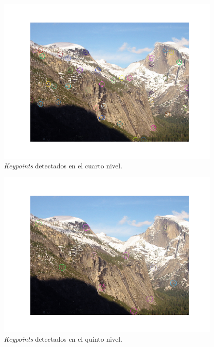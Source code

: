 \documentclass[11pt,a4paper]{article}
\begin{document}
\begin{figure}[H]
	\centering
	\includegraphics[scale=0.6]{img/scale3}
	\caption{\textit{Keypoints} detectados en el cuarto nivel.}
	\label{fig:scale3}
\end{figure}

\begin{figure}[H]
	\centering
	\includegraphics[scale=0.6]{img/scale4}
	\caption{\textit{Keypoints} detectados en el quinto nivel.}
	\label{fig:scale4}
\end{figure}
\end{document}
